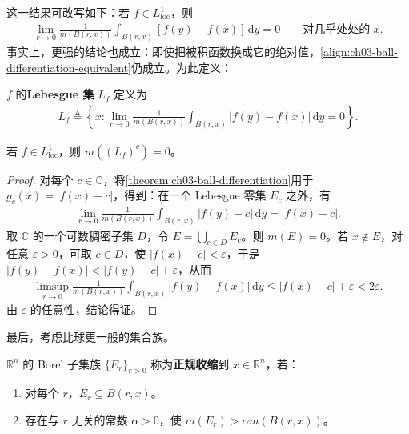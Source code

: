 \documentclass[../../main.tex]{subfiles}%
\begin{document}
这一结果可改写如下：若 $f\in L^1_{\mathrm{loc}}$，则
\begin{align}\label{align:ch03-ball-differentiation-equivalent}
\lim_{r\to0}\frac{1}{m(B(r,x))}\int_{B(r,x)}[f(y)-f(x)]\,\mathrm{d}y=0
\qquad\text{对几乎处处的 }x.
\end{align}
事实上，更强的结论也成立：即使把被积函数换成它的绝对值，\eqref{align:ch03-ball-differentiation-equivalent}仍成立。为此定义：
\begin{definition}[Lebesgue 集]\label{definition:ch03-lebesgue-set}
$f$ 的\textbf{Lebesgue 集} $L_f$ 定义为
\begin{align*}
L_f\triangleq\left\{x:\lim_{r\to0}\frac{1}{m(B(r,x))}\int_{B(r,x)}|f(y)-f(x)|\,\mathrm{d}y=0\right\}.
\end{align*}
\end{definition}
\begin{theorem}\label{theorem:ch03-lebesgue-set-full}
若 $f\in L^1_{\mathrm{loc}}$，则 $m((L_f)^c)=0$。
\end{theorem}
\begin{proof}
对每个 $c\in\mathbb{C}$，将\cref{theorem:ch03-ball-differentiation}用于 $g_c(x)=|f(x)-c|$，得到：在一个 Lebesgue 零集 $E_c$ 之外，有
\begin{align*}
\lim_{r\to0}\frac{1}{m(B(r,x))}\int_{B(r,x)}|f(y)-c|\,\mathrm{d}y=|f(x)-c|.
\end{align*}
取 $\mathbb{C}$ 的一个可数稠密子集 $D$，令 $E=\bigcup_{c\in D}E_c$。则 $m(E)=0$。若 $x\notin E$，对任意 $\varepsilon>0$，可取 $c\in D$，使 $|f(x)-c|<\varepsilon$，于是 $|f(y)-f(x)|<|f(y)-c|+\varepsilon$，从而
\begin{align*}
\limsup_{r\to0}\frac{1}{m(B(r,x))}\int_{B(r,x)}|f(y)-f(x)|\,\mathrm{d}y
\le|f(x)-c|+\varepsilon<2\varepsilon.
\end{align*}
由 $\varepsilon$ 的任意性，结论得证。
\end{proof}
最后，考虑比球更一般的集合族。
\begin{definition}[正规收缩]\label{definition:ch03-shrink-nicely}
$\mathbb{R}^n$ 的 Borel 子集族 $\{E_r\}_{r>0}$ 称为\textbf{正规收缩}到 $x\in\mathbb{R}^n$，若：
\begin{enumerate}
\item 对每个 $r$，$E_r\subseteq B(r,x)$。
\item 存在与 $r$ 无关的常数 $\alpha>0$，使 $m(E_r)>\alpha m(B(r,x))$。
\end{enumerate}
\end{definition}
\end{document}
